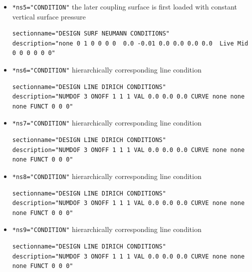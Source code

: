 \begin{itemize}
 \item \verb|*ns5="CONDITION"| \qquad the later coupling surface is first loaded with constant vertical surface pressure
 \begin{small} \begin{verbatim}
sectionname="DESIGN SURF NEUMANN CONDITIONS"
description="none 0 1 0 0 0 0  0.0 -0.01 0.0 0.0 0.0 0.0  Live Mid 0 0 0 0 0 0"
 \end{verbatim} \end{small}
 
 \item \verb|*ns6="CONDITION"| \qquad hierarchically corresponding line condition
 \begin{small} \begin{verbatim}
sectionname="DESIGN LINE DIRICH CONDITIONS"
description="NUMDOF 3 ONOFF 1 1 1 VAL 0.0 0.0 0.0 CURVE none none none FUNCT 0 0 0"
 \end{verbatim} \end{small}
 
 \item \verb|*ns7="CONDITION"| \qquad hierarchically corresponding line condition
 \begin{small} \begin{verbatim}
sectionname="DESIGN LINE DIRICH CONDITIONS"
description="NUMDOF 3 ONOFF 1 1 1 VAL 0.0 0.0 0.0 CURVE none none none FUNCT 0 0 0"
 \end{verbatim} \end{small}
 
 \item \verb|*ns8="CONDITION"| \qquad hierarchically corresponding line condition
 \begin{small} \begin{verbatim}
sectionname="DESIGN LINE DIRICH CONDITIONS"
description="NUMDOF 3 ONOFF 1 1 1 VAL 0.0 0.0 0.0 CURVE none none none FUNCT 0 0 0"
 \end{verbatim} \end{small}
 
 \item \verb|*ns9="CONDITION"| \qquad hierarchically corresponding line condition
 \begin{small} \begin{verbatim}
sectionname="DESIGN LINE DIRICH CONDITIONS"
description="NUMDOF 3 ONOFF 1 1 1 VAL 0.0 0.0 0.0 CURVE none none none FUNCT 0 0 0"
 \end{verbatim} \end{small}

\end{itemize}

